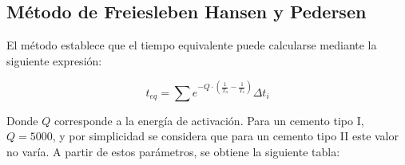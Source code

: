 \subsection*{Método de Freiesleben Hansen y Pedersen}

El método establece que el tiempo equivalente puede calcularse mediante la siguiente expresión:

\begin{equation}
    t_{eq} = \sum e^{-Q \cdot \left(\frac{1}{T_a} - \frac{1}{T_s}\right)} \Delta t_i
\end{equation}

Donde $Q$ corresponde a la energía de activación. Para un cemento tipo I, $Q = 5000$, y por simplicidad se considera que para un cemento tipo II este valor no varía.  
A partir de estos parámetros, se obtiene la siguiente tabla:

